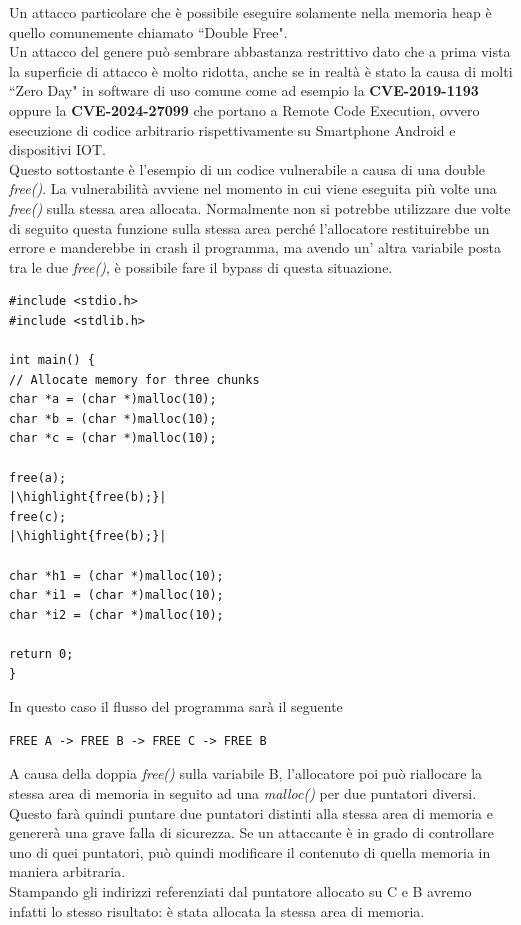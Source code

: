 Un attacco particolare che è possibile eseguire solamente nella memoria heap è quello comunemente chiamato ``Double Free". \\
Un attacco del genere può sembrare abbastanza restrittivo dato che a prima vista la superficie di attacco è molto ridotta, anche se in realtà è stato la causa di molti ``Zero Day" in software di uso comune come ad esempio la \textbf{CVE-2019-1193} \cite{TrendMicroWhatsapp} oppure la \textbf{CVE-2024-27099} che portano a Remote Code Execution, ovvero esecuzione di codice arbitrario rispettivamente su Smartphone Android e dispositivi IOT. \\
\newline
Questo sottostante è l'esempio di un codice vulnerabile \cite{HackTricksDoubleFree} a causa di una double \textit{free()}. La vulnerabilità avviene nel momento in cui viene eseguita più volte una \textit{free()} sulla stessa area allocata. Normalmente non si potrebbe utilizzare due volte di seguito questa funzione sulla stessa area perché l'allocatore restituirebbe un errore e manderebbe in crash il programma, ma avendo un' altra variabile posta tra le due \textit{free()}, è possibile fare il bypass di questa situazione.
\begin{verbatim}
#include <stdio.h>
#include <stdlib.h>

int main() {
// Allocate memory for three chunks
char *a = (char *)malloc(10);
char *b = (char *)malloc(10);
char *c = (char *)malloc(10);

free(a);
|\highlight{free(b);}|
free(c);
|\highlight{free(b);}|

char *h1 = (char *)malloc(10);
char *i1 = (char *)malloc(10);
char *i2 = (char *)malloc(10);

return 0;
}
\end{verbatim}
In questo caso il flusso del programma sarà il seguente \\
\begin{verbatim}
FREE A -> FREE B -> FREE C -> FREE B
\end{verbatim}

A causa della doppia \textit{free()} sulla variabile B, l'allocatore poi può riallocare la stessa area di memoria in seguito ad una \textit{malloc()} per due puntatori diversi. Questo farà quindi puntare due puntatori distinti alla stessa area di memoria e genererà una grave falla di sicurezza. Se un attaccante è in grado di controllare uno di quei puntatori, può quindi modificare il contenuto di quella memoria in maniera arbitraria. \\
\newline
Stampando gli indirizzi referenziati dal puntatore allocato su C e B avremo infatti lo stesso risultato: è stata allocata la stessa area di memoria.


